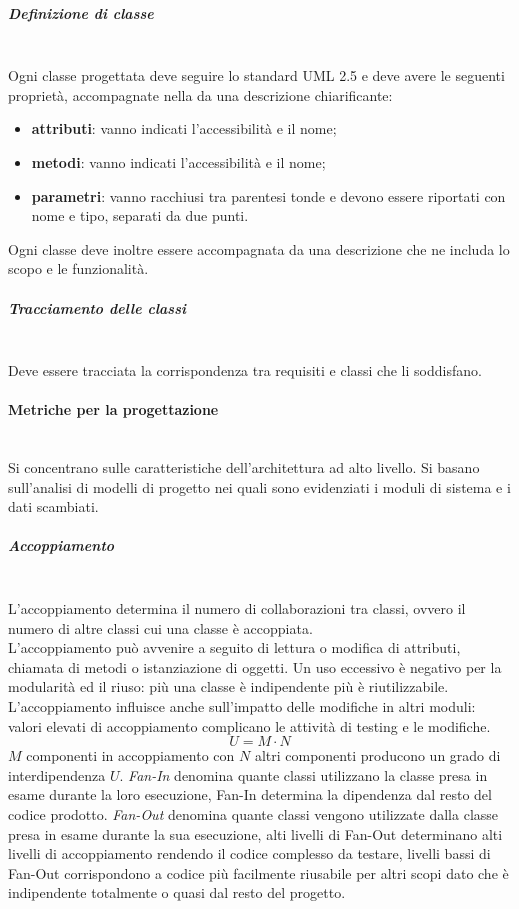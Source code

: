 \subparagraph{Definizione di classe}\mbox{}\\
Ogni classe progettata deve seguire lo standard UML 2.5 e deve avere le seguenti proprietà, accompagnate nella \DefinizioneDiProdotto{} da una descrizione chiarificante:
\begin{itemize}
	\item \textbf{attributi}: vanno indicati l'accessibilità e il nome;
	\item \textbf{metodi}: vanno indicati l'accessibilità e il nome;
	\item \textbf{parametri}: vanno racchiusi tra parentesi tonde e devono essere riportati con nome e tipo, separati da due punti.
\end{itemize}
Ogni classe deve inoltre essere accompagnata da una descrizione che ne includa lo scopo e le funzionalità.

\subparagraph{Tracciamento delle classi}\mbox{}\\
Deve essere tracciata la corrispondenza tra requisiti e classi che li soddisfano.

\paragraph{Metriche per la progettazione}\mbox{}\\
Si concentrano sulle caratteristiche dell'architettura ad alto livello. Si basano sull'analisi di modelli di progetto nei quali sono evidenziati i moduli di sistema e i dati scambiati.

\subparagraph{Accoppiamento}\mbox{}\\
L'accoppiamento determina il numero di collaborazioni tra classi, ovvero il numero di altre classi cui una classe è accoppiata.\\
L'accoppiamento può avvenire a seguito di lettura o modifica di attributi, chiamata di metodi o istanziazione di oggetti. Un uso eccessivo è negativo per la modularità ed il riuso: più una classe è indipendente più è riutilizzabile. L'accoppiamento influisce anche sull'impatto delle modifiche in altri moduli: valori elevati di accoppiamento complicano le attività di testing e le modifiche.
\[ U = M \cdot N \]
$M$ componenti in accoppiamento con $N$ altri componenti producono un grado di interdipendenza $U$.
\textit{Fan-In} denomina quante classi utilizzano la classe presa in esame durante la loro esecuzione, Fan-In determina la dipendenza dal resto del codice prodotto. 
\textit{Fan-Out} denomina quante classi vengono utilizzate dalla classe presa in esame durante la sua esecuzione, alti livelli di Fan-Out determinano alti livelli di accoppiamento rendendo il codice complesso da testare, livelli bassi di Fan-Out corrispondono a codice più facilmente riusabile per altri scopi dato che è indipendente totalmente o quasi dal resto del progetto.

